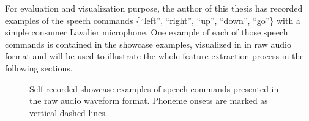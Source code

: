 For evaluation and visualization purpose, the author of this thesis has recorded examples of the speech commands \{\enquote{left}, \enquote{right}, \enquote{up}, \enquote{down}, \enquote{go}\} with a simple consumer Lavalier microphone.
One example of each of those speech commands is contained in the showcase examples, visualized in  in raw audio format and will be used to illustrate the whole feature extraction process in the following sections.
\begin{figure}[!ht]
  \centering
  \caption{Self recorded showcase examples of speech commands presented in the raw audio waveform format. Phoneme onsets are marked as vertical dashed lines.}
  \label{fig:signal_raw_showcase}
\end{figure}
